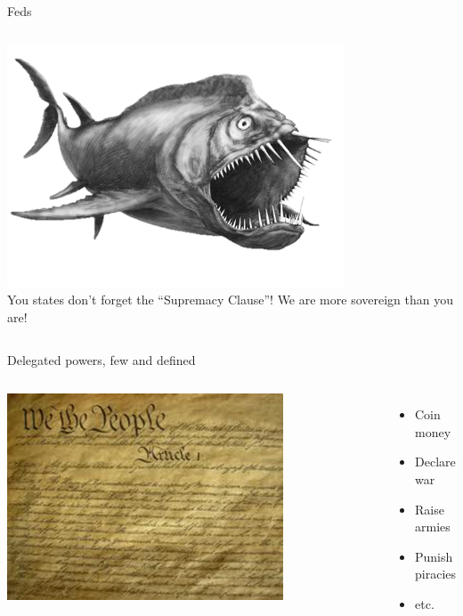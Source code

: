 \begin{frame}{Feds}
    \begin{columns}[c]
            \centering
            \includegraphics[width=0.75\textwidth]{img/fed-fish.png} \\
        \column{0.5\textheight}
            You states don't forget the ``Supremacy Clause''! We are more sovereign than you are!
    \end{columns}
\end{frame}

\begin{frame}{Delegated powers, few and defined}
    \begin{columns}[c]
            \centering
            \includegraphics[width=0.75\textwidth]{img/constitution.png} \\
        \column{0.5\textheight}
            \begin{itemize}
                \item Coin money
                \item Declare war
                \item Raise armies
                \item Punish piracies
                \item etc.
            \end{itemize}
    \end{columns}
\end{frame}

